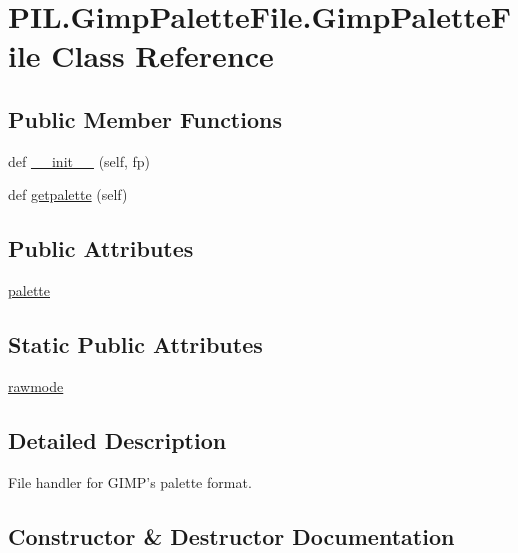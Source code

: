 \hypertarget{classPIL_1_1GimpPaletteFile_1_1GimpPaletteFile}{}\section{P\+I\+L.\+Gimp\+Palette\+File.\+Gimp\+Palette\+File Class Reference}
\label{classPIL_1_1GimpPaletteFile_1_1GimpPaletteFile}
\subsection*{Public Member Functions}
\begin{DoxyCompactItemize}
\item 
def \hyperlink{classPIL_1_1GimpPaletteFile_1_1GimpPaletteFile_a1098a0205302b573e8b13f5388c75f86}{\+\_\+\+\_\+init\+\_\+\+\_\+} (self, fp)
\item 
def \hyperlink{classPIL_1_1GimpPaletteFile_1_1GimpPaletteFile_a450e669d2a2db8034668accf81d9b7d4}{getpalette} (self)
\end{DoxyCompactItemize}
\subsection*{Public Attributes}
\begin{DoxyCompactItemize}
\item 
\hyperlink{classPIL_1_1GimpPaletteFile_1_1GimpPaletteFile_a9d0e4049ebb06730b63bb0f0b637e0b1}{palette}
\end{DoxyCompactItemize}
\subsection*{Static Public Attributes}
\begin{DoxyCompactItemize}
\item 
\hyperlink{classPIL_1_1GimpPaletteFile_1_1GimpPaletteFile_ad83daa637ba5a3bde200cff34a6d6a4e}{rawmode}
\end{DoxyCompactItemize}


\subsection{Detailed Description}
\begin{DoxyVerb}File handler for GIMP's palette format.\end{DoxyVerb}
 

\subsection{Constructor \& Destructor Documentation}
\mbox{\label{classPIL_1_1GimpPaletteFile_1_1GimpPaletteFile_a1098a0205302b573e8b13f5388c75f86}} 
